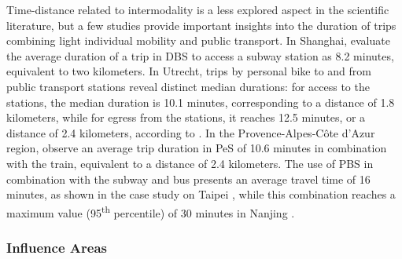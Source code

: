 \begin{refsegment}
Time-distance related to intermodality is a less explored aspect in the scientific literature, but a few studies provide important insights into the duration of trips combining light individual mobility and public transport. In Shanghai, \textcolor{blue}{\textcite[19]{lin_analysis_2019}} evaluate the average duration of a trip in \acrshort{DBS} to access a subway station as 8.2 minutes, equivalent to two kilometers. In Utrecht, trips by personal bike to and from public transport stations reveal distinct median durations: for access to the stations, the median duration is 10.1 minutes, corresponding to a distance of 1.8 kilometers, while for egress from the stations, it reaches 12.5 minutes, or a distance of 2.4 kilometers, according to \textcolor{blue}{\textcite[268]{krygsman_multimodal_2004}}. In the Provence-Alpes-Côte d'Azur region, \textcolor{blue}{\textcite[186]{moinse_intermodal_2022}} observe an average trip duration in \acrshort{PeS} of 10.6 minutes in combination with the train, equivalent to a distance of 2.4 kilometers. The use of \acrshort{PBS} in combination with the subway and bus presents an average travel time of 16 minutes, as shown in the case study on Taipei \textcolor{blue}{\autocite[49]{lu_improving_2018}}, while this combination reaches a maximum value (95\textsuperscript{th} percentile) of 30 minutes in Nanjing \textcolor{blue}{\autocite[64]{ma_understanding_2018}}.%

\subsubsection*{Influence Areas
    \label{chap2:aires-influence}
    }


\end{refsegment}
